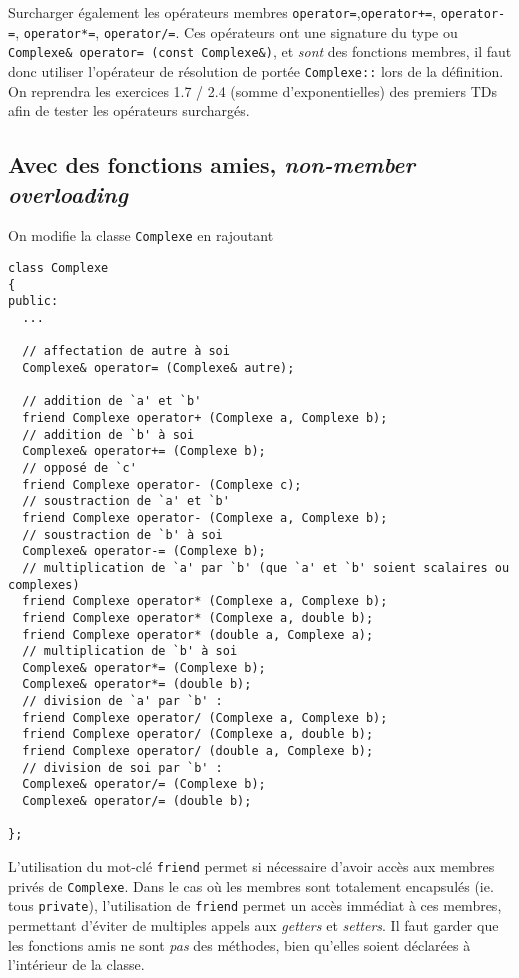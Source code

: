 \documentclass{book}
\newcommand{\inline}[1]{\texttt{#1}}
\begin{document}
Surcharger également les opérateurs membres \inline{operator=},\inline{operator+=}, \inline{operator-=}, \inline{operator*=}, \inline{operator/=}. Ces opérateurs ont une signature du type ou \inline{Complexe& operator= (const Complexe&)}, et \emph{sont} des fonctions membres, il faut donc utiliser l'opérateur de résolution de portée \inline{Complexe::} lors de la définition. \\

On reprendra les exercices 1.7 / 2.4 (somme d'exponentielles) des premiers TDs afin de tester les opérateurs surchargés.

\begin{correction}

\subsection*{Avec des fonctions amies, \textit{non-member overloading}}

On modifie la classe \inline{Complexe} en rajoutant
\begin{verbatim}
class Complexe
{
public:
  ...

  // affectation de autre à soi
  Complexe& operator= (Complexe& autre);
  
  // addition de `a' et `b'
  friend Complexe operator+ (Complexe a, Complexe b);
  // addition de `b' à soi
  Complexe& operator+= (Complexe b);
  // opposé de `c'
  friend Complexe operator- (Complexe c);
  // soustraction de `a' et `b'
  friend Complexe operator- (Complexe a, Complexe b);
  // soustraction de `b' à soi
  Complexe& operator-= (Complexe b);
  // multiplication de `a' par `b' (que `a' et `b' soient scalaires ou complexes)
  friend Complexe operator* (Complexe a, Complexe b);
  friend Complexe operator* (Complexe a, double b);
  friend Complexe operator* (double a, Complexe a);
  // multiplication de `b' à soi
  Complexe& operator*= (Complexe b);
  Complexe& operator*= (double b);
  // division de `a' par `b' :
  friend Complexe operator/ (Complexe a, Complexe b);
  friend Complexe operator/ (Complexe a, double b);
  friend Complexe operator/ (double a, Complexe b);
  // division de soi par `b' :
  Complexe& operator/= (Complexe b);
  Complexe& operator/= (double b);

};
\end{verbatim}
L'utilisation du mot-clé \inline{friend} permet si nécessaire d'avoir accès aux membres privés de \inline{Complexe}. Dans le cas où les membres sont totalement encapsulés (ie. tous \inline{private}), l'utilisation de \inline{friend} permet un accès immédiat à ces membres, permettant d'éviter de multiples appels aux \emph{getters} et \emph{setters}. Il faut garder que les fonctions amis ne sont \emph{pas} des méthodes, bien qu'elles soient déclarées à l'intérieur de la classe.


\end{correction}
\end{document}

